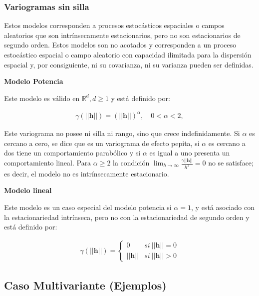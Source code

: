 \documentclass[
]{book}
\begin{document}
\hypertarget{variogramas-sin-silla}{%
\subsubsection*{Variogramas sin silla}\label{variogramas-sin-silla}}

Estos modelos corresponden a procesos estocásticos espaciales o campos aleatorios que son intrínsecamente estacionarios, pero no son estacionarios de segundo orden. Estos modelos son no acotados y corresponden a un proceso estocástico espacial o campo aleatorio con capacidad ilimitada para la dispersión espacial y, por consiguiente, ni su covarianza, ni su varianza pueden ser definidas.

\textbf{Modelo Potencia}

Este modelo es válido en \(\mathbb{R}^d,d\geq 1\) y está definido por:

\begin{align}
  \gamma(||\textbf{h}||)=(||\textbf{h}||)^\alpha,\quad  0<\alpha<2, 
\end{align}

Este variograma no posee ni silla ni rango, sino que crece indefinidamente. Si \(\alpha\) es cercano a cero, se dice que es un variograma de efecto pepita, si \(\alpha\) es cercano a dos tiene un comportamiento parabólico y si \(\alpha\) es igual a uno presenta un comportamiento lineal. Para \(\alpha\geq 2\) la condición \(\lim_{h\to \infty}\frac{\gamma||\textbf{h}||}{h^2}=0\) no se satisface; es decir, el modelo no es intrínsecamente estacionario.

\textbf{Modelo lineal}

Este modelo es un caso especial del modelo potencia si \(\alpha=1\), y está asociado con la estacionariedad intrínseca, pero no con la estacionariedad de segundo orden y está definido por:

\begin{align}
  \gamma(||\textbf{h}||)=\left \{ \begin{matrix} 0 & si\ ||\textbf{h}||=0\\
  ||\textbf{h}|| & si\ ||\textbf{h}||>0 \end{matrix}\right.
\end{align}

\hypertarget{caso-multivariante-ejemplos}{%
\subsection{Caso Multivariante (Ejemplos)}\label{caso-multivariante-ejemplos}}
\end{document}

